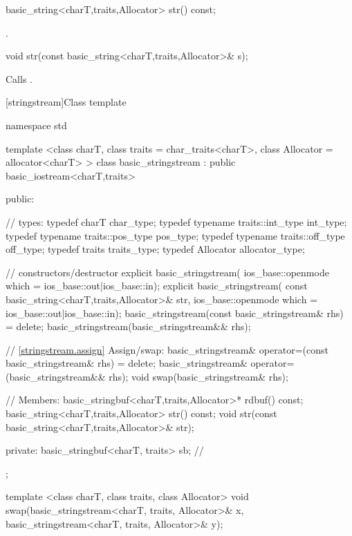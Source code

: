 %
\begin{itemdecl}
basic_string<charT,traits,Allocator> str() const;
\end{itemdecl}

\begin{itemdescr}
\pnum
\returns
{}.
\end{itemdescr}

%
%
\begin{itemdecl}
void str(const basic_string<charT,traits,Allocator>& s);
\end{itemdecl}

\begin{itemdescr}
\pnum
\effects
Calls
.
\end{itemdescr}

[stringstream]{Class template }

%
\begin{codeblock}
namespace std {
  template <class charT, class traits = char_traits<charT>,
        class Allocator = allocator<charT> >
  class basic_stringstream
    : public basic_iostream<charT,traits> {
  public:

    // types:
    typedef charT                     char_type;
    typedef typename traits::int_type int_type;
    typedef typename traits::pos_type pos_type;
    typedef typename traits::off_type off_type;
    typedef traits                    traits_type;
    typedef Allocator                 allocator_type;

    // constructors/destructor
    explicit basic_stringstream(
    ios_base::openmode which = ios_base::out|ios_base::in);
    explicit basic_stringstream(
    const basic_string<charT,traits,Allocator>& str,
    ios_base::openmode which = ios_base::out|ios_base::in);
    basic_stringstream(const basic_stringstream& rhs) = delete;
    basic_stringstream(basic_stringstream&& rhs);

    // \ref{stringstream.assign} Assign/swap:
    basic_stringstream& operator=(const basic_stringstream& rhs) = delete;
    basic_stringstream& operator=(basic_stringstream&& rhs);
    void swap(basic_stringstream& rhs);

    // Members:
    basic_stringbuf<charT,traits,Allocator>* rdbuf() const;
    basic_string<charT,traits,Allocator> str() const;
    void str(const basic_string<charT,traits,Allocator>& str);

  private:
    basic_stringbuf<charT, traits> sb;  // \exposr
  };

  template <class charT, class traits, class Allocator>
  void swap(basic_stringstream<charT, traits, Allocator>& x,
            basic_stringstream<charT, traits, Allocator>& y);
}
\end{codeblock}

